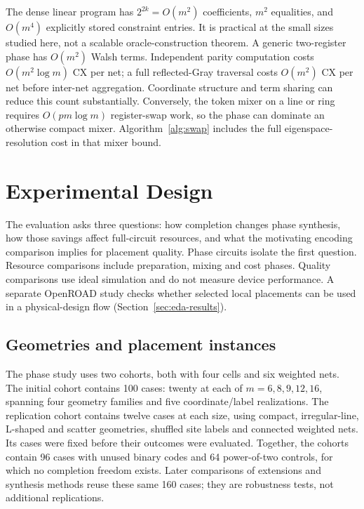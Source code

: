 \documentclass[manuscript,screen,review]{acmart}
\begin{document}
The dense linear program has $2^{2k}=O(m^2)$ coefficients, $m^2$ equalities,
and $O(m^4)$ explicitly stored constraint entries. It is practical at the
small sizes studied here, not a scalable oracle-construction theorem. A
generic two-register phase has $O(m^2)$ Walsh terms. Independent parity
computation costs $O(m^2\log m)$ CX per net; a full reflected-Gray traversal
costs $O(m^2)$ CX per net before inter-net aggregation. Coordinate structure and term sharing can reduce
this count substantially. Conversely, the token mixer on a line or ring
requires $O(pm\log m)$ register-swap work, so the phase can dominate an
otherwise compact mixer. Algorithm~\ref{alg:swap} includes the full
eigenspace-resolution cost in that mixer bound.



\section{Experimental Design}
\label{sec:design}
The evaluation asks three questions: how completion changes phase synthesis,
how those savings affect full-circuit resources, and what the motivating
encoding comparison implies for placement quality. Phase circuits isolate
the first question. Resource comparisons include preparation, mixing and
cost phases. Quality comparisons use ideal simulation and do not measure
device performance. A separate OpenROAD study checks whether selected
local placements can be used in a physical-design flow
(Section~\ref{sec:eda-results}).

\subsection{Geometries and placement instances}
The phase study uses two cohorts, both with four cells and six weighted nets.
The initial cohort contains 100 cases: twenty at each of
$m=6,8,9,12,16$, spanning four geometry families and five coordinate/label
realizations. The replication cohort contains twelve cases at each size,
using compact, irregular-line, L-shaped and scatter geometries, shuffled
site labels and connected weighted nets. Its cases were fixed before their
outcomes were evaluated. Together, the cohorts contain 96 cases with unused
binary codes and 64 power-of-two controls, for which no completion freedom
exists. Later comparisons of extensions and synthesis methods reuse these
same 160 cases; they are robustness tests, not additional replications.
\end{document}
